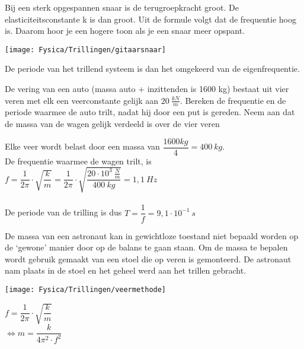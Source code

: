 \documentclass{ximera}
\begin{document}
\begin{example} 
    Bij een sterk opgespannen snaar is de terugroepkracht groot. De elasticiteitsconstante k is dan groot. Uit de formule volgt dat de frequentie hoog is. Daarom hoor je een hogere toon als je een snaar meer opspant.
    \begin{image}[0.5\textwidth]
    \texttt{[image: Fysica/Trillingen/gitaarsnaar]}
    \end{image}
    
\end{example} 
De periode van het trillend systeem is dan het omgekeerd van de eigenfrequentie.
\begin{center}
\end{center}
\begin{example}
    De vering van een auto (massa auto + inzittenden is 1600 kg) bestaat uit vier veren met elk een veerconstante gelijk aan $20 \ \frac{kN}{m}$. 
    Bereken de frequentie en de periode waarmee de auto trilt, nadat hij door een put is gereden. Neem aan dat de massa van de wagen gelijk verdeeld is over de vier veren
    \begin{oplossing}
        Elke veer wordt belast door een massa van $\dfrac{1600 kg}{4}=400 \ kg$. \\
        De frequentie waarmee de wagen trilt, is \\
        $f=\dfrac{1}{2\pi}\cdot \sqrt{\dfrac{k}{m}}=\dfrac{1}{2\pi}\cdot \sqrt{\dfrac{20\cdot 10^3 \ \frac{N}{m}}{400 \ kg}}=1,1 \ Hz$ \\ \ \\ 

        De periode van de trilling is dus $T=\dfrac{1}{f}=9,1\cdot 10^{-1} \ s$

    \end{oplossing}
\end{example}

\begin{example}  De massa van een astronaut kan in gewichtloze toestand niet bepaald worden op de ‘gewone’ manier door op de balans te gaan staan.
Om de massa te bepalen wordt gebruik gemaakt van een stoel die op veren is gemonteerd. De astronaut nam plaats in de stoel en het geheel werd aan het trillen gebracht.

\begin{image}
    \texttt{[image: Fysica/Trillingen/veermethode]}
\end{image} 
\begin{center}
    $f=\dfrac{1}{2\pi}\cdot \sqrt{\dfrac{k}{m}}$ \\
    $\Leftrightarrow m=\dfrac{k}{4\pi^2\cdot f^2}$
\end{center}
\end{example}
\end{document}
